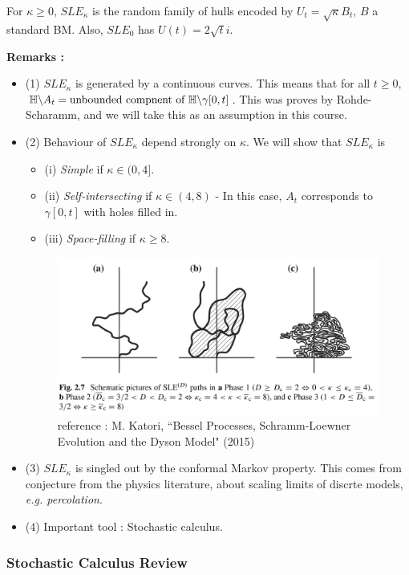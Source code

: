 \documentclass[12pt,a4paper]{article}
\renewenvironment{i}
{\begin{itemize} 
	}%
	{\end{itemize}
}
\begin{document}
For $\kappa\geq 0$, $SLE_{\kappa}$ is the random family of hulls encoded by $U_t = \sqrt{\kappa} B_t$, $B$ a standard BM. Also, $SLE_{0}$ has $U(t) = 2\sqrt{t} i$.
\s

\textbf{Remarks :}
\begin{i}
\item[(1)] $SLE_{\kappa}$ is generated by a continuous curves. This means that for all $t\geq 0$, $\mathbb{H} \backslash A_t=\text{unbounded compnent of } \mathbb{H}\backslash \gamma[0,t]$. This was proves by Rohde-Scharamm, and we will take this as an assumption in this course.
\item[(2)] Behaviour of $SLE_{\kappa}$ depend strongly on $\kappa$. We will show that $SLE_{\kappa}$ is
\begin{i}
\item[(i)] \emph{Simple} if $\kappa \in (0,4]$.
\item[(ii)] \emph{Self-intersecting} if $\kappa \in (4,8)$ - In this case, $A_t$ corresponds to $\gamma[0,t]$ with holes filled in.
\item[(iii)] \emph{Space-filling} if $\kappa \geq 8$.
\end{i}
\begin{figure}[h]
\begin{center}
    \includegraphics[scale =0.15]{6}
    \caption{reference : M. Katori, ``Bessel Processes, Schramm-Loewner Evolution and the Dyson Model" (2015)}
\end{center}
\end{figure}
\item[(3)] $SLE_{\kappa}$ is singled out by the conformal Markov property. This comes from conjecture from the physics literature, about scaling limits of discrte models, \textit{e.g. percolation}.
\item[(4)] Important tool : Stochastic calculus.
\end{i}
\s

\subsubsection*{Stochastic Calculus Review}
\end{document}
